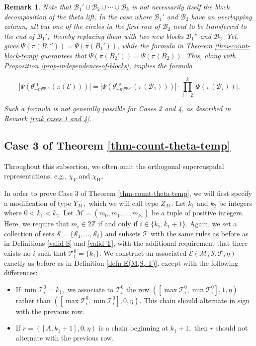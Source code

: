 \documentclass[11pt,letterpaper]{amsart}
\newcommand{\up}{{\mathrm{up}}}
\newcommand{\EE}{\mathcal{E}}
\newtheorem{rmk}[thm]{Remark}
\numberwithin{equation}{section}
\begin{document}
\begin{rmk}
    Note that $\mathcal{B}_1' \cup \mathcal{B}_2 \cup \cdots \cup \mathcal{B}_k$ is not necessarily itself the block decomposition of the theta lift. In the case where $\mathcal{B}_1'$ and $\mathcal{B}_2$ have an overlapping column, all but one of the circles in the first row of $\mathcal{B}_2$ need to be transferred to the end of $\mathcal{B}_1',$ thereby replacing them with two new blocks $\mathcal{B}_1''$ and $\mathcal{B}_2.$ Yet, \cite[Lemma 6.8]{HKT26} gives $\Psi(\pi(B_1'')) = \Psi(\pi(B_1'))$, while the formula in Theorem \ref{thm-count-block-temp} guarantees that $\Psi(\pi(B_2')) = \Psi(\pi(B_2))$. This, along with Proposition \ref{prop-independence-of-blocks}, implies the formula

    \[|\Psi(\theta_{-m^{\up, \alpha}}^\up(\pi(\EE)))| = |\Psi(\theta_{-m^{\up, \alpha}}^\up(\pi(\mathcal{B}_1)))| \cdot \prod_{i=2}^k |\Psi(\pi(\mathcal{B}_i))|.\]

    Such a formula is not generally possible for Cases 2 and 4, as described in Remark \ref{rmk cases 1 and 4}.
\end{rmk}

\subsection{Case 3 of Theorem \ref{thm-count-theta-temp}}\label{sec case 3}

Throughout this subsection, we often omit the orthogonal supercuspidal representations, e.g.,  $\chi_V$ and $\chi_W$. 

In order to prove Case 3 of Theorem \ref{thm-count-theta-temp}, we will first specify a modification of type $Y_{\mathcal{M}},$ which we will call type $Z_{\mathcal{M}}.$ Let $k_1$ and $k_2$ be integers where $0 < k_1 < k_2.$ Let $\mathcal{M} = (m_0, m_1, \dots, m_{k_2})$ be a tuple of positive integers. Here, we require that $m_i \in 2 \mathbb{Z}$ if and only if $i \in \{k_1, k_1 + 1\}.$ Again, we set a collection of sets $\mathcal{S} = \{\mathcal{S}_1, \dots, \mathcal{S}_\ell\}$ and subsets $\mathcal{T}$ with the same rules as before as in Definitions \ref{valid S} and \ref{valid T}, with the additional requirement that there exists no $i$ such that $\mathcal{T}_i^0 = \{k_1\}.$ We construct an associated $\mathcal{E}(\mathcal{M}, \mathcal{S}, \mathcal{T}, \eta)$ exactly as before as in Definition \ref{defn E(M,S, T)}, except with the following differences:

\begin{itemize}
    \item If $\min \mathcal{T}_i^0 = k_1,$ we associate to $\mathcal{T}_i^0$ the row $([\max \mathcal{T}_i^0, \min \mathcal{T}_i^0], 1, \eta)$ rather than $([\max \mathcal{T}_i^0, \min \mathcal{T}_i^0], 0, \eta).$ This chain should alternate in sign with the previous row.
    \item If $r = ([A, k_1 + 1], 0, \eta)$ is a chain beginning at $k_1 + 1,$ then $r$ should not alternate with the previous row.
\end{itemize}
\end{document}
